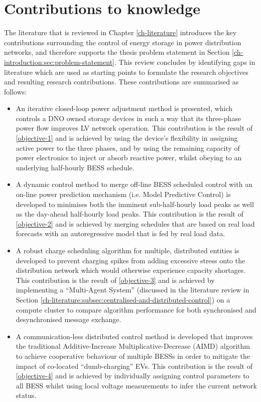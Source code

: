 \section{Contributions to knowledge}
\label{ch-introduction:sec:contributions}

The literature that is reviewed in Chapter \ref{ch-literature} introduces the key contributions surrounding the control of energy storage in power distribution networks, and therefore supports the thesis problem statement in Section \ref{ch-introduction:sec:problem-statement}.
This review concludes by identifying gaps in literature which are used as starting points to formulate the research objectives and resulting research contributions.
These contributions are summarised as follows:

\begin{itemize}
	\item
	An iterative closed-loop power adjustment method is presented, which controls a DNO owned storage devices in such a way that its three-phase power flow improves LV network operation.
	This contribution is the result of \ref{objective-1} and is achieved by using the device's flexibility in assigning active power to the three phases, and by using the remaining capacity of power electronics to inject or absorb reactive power, whilst obeying to an underlying half-hourly BESS schedule.
	\item
	A dynamic control method to merge off-line BESS scheduled control with an on-line power prediction mechanism (i.e. Model Predictive Control) is developed to minimises both the imminent sub-half-hourly load peaks as well as the day-ahead half-hourly load peaks.
	This contribution is the result of \ref{objective-2} and is achieved by merging schedules that are based on real load forecasts with an autoregressive model that is fed by real load data.
	\item
	A robust charge scheduling algorithm for multiple, distributed entities is developed to prevent charging spikes from adding excessive stress onto the distribution network which would otherwise experience capacity shortages.
	This contribution is the result of \ref{objective-3} and is achieved by implementing a ``Multi-Agent System'' (discussed in the literature review in Section \ref{ch-literature:subsec:centralised-and-distributed-control}) on a compute cluster to compare algorithm performance for both synchronised and desynchronised message exchange.
	\item
	A communication-less distributed control method is developed that improves the traditional Additive-Increase Multiplicative-Decrease (AIMD) algorithm to achieve cooperative behaviour of multiple BESSs in order to mitigate the impact of co-located ``dumb-charging'' EVs.
	This contribution is the result of \ref{objective-4} and is achieved by individually assigning control parameters to all BESS whilst using local voltage measurements to infer the current network status.
\end{itemize}
